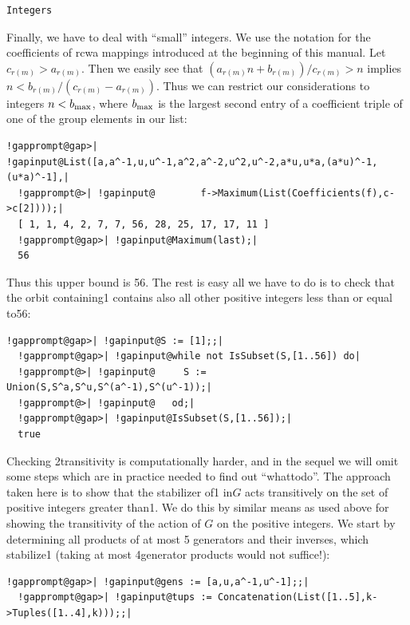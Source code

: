 \documentclass[a4paper,11pt]{report}
\begin{document}
{{\begin{Verbatim}[commandchars=@|A,fontsize=\small,frame=single,label=Example]
  Integers
\end{Verbatim}
 Finally, we have to deal with ``small'' integers. We use the notation for the coefficients of rcwa mappings introduced
at the beginning of this manual. Let $c_{r(m)} > a_{r(m)}$. Then we easily see that $(a_{r(m)}n+b_{r(m)})/c_{r(m)} > n$ implies $n < b_{r(m)}/(c_{r(m)}-a_{r(m)})$. Thus we can restrict our considerations to integers $n < b_{\rm max}$, where $b_{\rm max}$ is the largest second entry of a coefficient triple of one of the group
elements in our list: 
\begin{Verbatim}[commandchars=!@|,fontsize=\small,frame=single,label=Example]
  !gapprompt@gap>| !gapinput@List([a,a^-1,u,u^-1,a^2,a^-2,u^2,u^-2,a*u,u*a,(a*u)^-1,(u*a)^-1],|
  !gapprompt@>| !gapinput@        f->Maximum(List(Coefficients(f),c->c[2])));|
  [ 1, 1, 4, 2, 7, 7, 56, 28, 25, 17, 17, 11 ]
  !gapprompt@gap>| !gapinput@Maximum(last);|
  56
\end{Verbatim}
 Thus this upper bound is 56. The rest is easy
\texttt{}\texttt{} all we have to do is to check that
the orbit containing{\nobreakspace}1 contains also all other positive integers
less than or equal to{\nobreakspace}56: 
\begin{Verbatim}[commandchars=!@|,fontsize=\small,frame=single,label=Example]
  !gapprompt@gap>| !gapinput@S := [1];;|
  !gapprompt@gap>| !gapinput@while not IsSubset(S,[1..56]) do|
  !gapprompt@>| !gapinput@     S := Union(S,S^a,S^u,S^(a^-1),S^(u^-1));|
  !gapprompt@>| !gapinput@   od;|
  !gapprompt@gap>| !gapinput@IsSubset(S,[1..56]);|
  true
\end{Verbatim}
 Checking 2\texttt{}transitivity is computationally harder, and in
the sequel we will omit some steps which are in practice needed to find out ``what{\nobreakspace}to{\nobreakspace}do''. The approach taken here is to show that the stabilizer of{\nobreakspace}1
in{\nobreakspace}$G$ acts transitively on the set of positive integers greater
than{\nobreakspace}1. We do this by similar means as used above for showing
the transitivity of the action of $G$ on the positive integers. We start by determining all products of at most 5
generators and their inverses, which stabilize{\nobreakspace}1 (taking at most
4\texttt{}generator products would not suffice!): 
\begin{Verbatim}[commandchars=!@|,fontsize=\small,frame=single,label=Example]
  !gapprompt@gap>| !gapinput@gens := [a,u,a^-1,u^-1];;|
  !gapprompt@gap>| !gapinput@tups := Concatenation(List([1..5],k->Tuples([1..4],k)));;|

\end{Verbatim}}}
\end{document}
